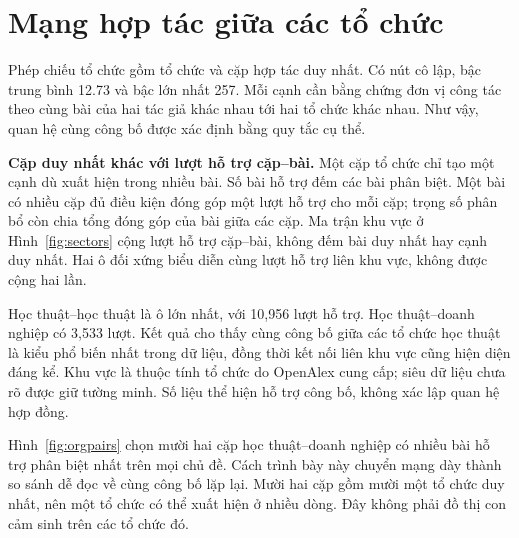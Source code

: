 \section{Mạng hợp tác giữa các tổ chức}
Phép chiếu tổ chức gồm \Organizations{} tổ chức và \OrganizationPairs{} cặp
hợp tác duy nhất. Có \OrganizationIsolates{} nút cô lập, bậc trung bình 12.73
và bậc lớn nhất 257. Mỗi cạnh cần bằng chứng đơn vị công tác theo cùng bài của
hai tác giả khác nhau tới hai tổ chức khác nhau. Như vậy, quan hệ cùng công bố
được xác định bằng quy tắc cụ thể.

\textbf{Cặp duy nhất khác với lượt hỗ trợ cặp--bài.} Một cặp tổ chức chỉ tạo
một cạnh dù xuất hiện trong nhiều bài. Số bài hỗ trợ đếm các bài phân biệt.
Một bài có nhiều cặp đủ điều kiện đóng góp một lượt hỗ trợ cho mỗi cặp; trọng
số phân bổ còn chia tổng đóng góp của bài giữa các cặp. Ma trận khu vực ở
Hình~\ref{fig:sectors} cộng lượt hỗ trợ cặp--bài, không đếm bài duy nhất hay
cạnh duy nhất. Hai ô đối xứng biểu diễn cùng lượt hỗ trợ liên khu vực, không
được cộng hai lần.

\FloatBarrier

Học thuật--học thuật là ô lớn nhất, với 10,956 lượt hỗ trợ. Học thuật--doanh
nghiệp có 3,533 lượt. Kết quả cho thấy cùng công bố giữa các tổ chức học thuật
là kiểu phổ biến nhất trong dữ liệu, đồng thời kết nối liên khu vực cũng hiện
diện đáng kể. Khu vực là thuộc tính tổ chức do OpenAlex cung cấp; siêu dữ liệu
chưa rõ được giữ tường minh. Số liệu thể hiện hỗ trợ công bố, không xác lập
quan hệ hợp đồng.

\Needspace{17cm}
Hình~\ref{fig:orgpairs} chọn mười hai cặp học thuật--doanh nghiệp có nhiều bài
hỗ trợ phân biệt nhất trên mọi chủ đề. Cách trình bày này chuyển mạng dày thành
so sánh dễ đọc về cùng công bố lặp lại. Mười hai cặp gồm mười một tổ chức duy
nhất, nên một tổ chức có thể xuất hiện ở nhiều dòng. Đây không phải đồ thị con
cảm sinh trên các tổ chức đó.

\FloatBarrier

